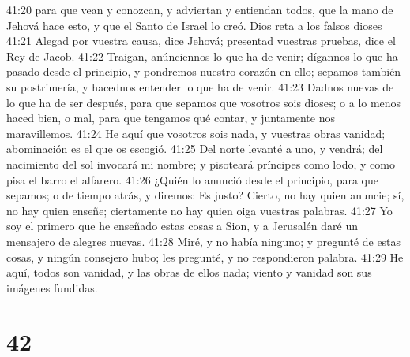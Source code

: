 41:20 para que vean y conozcan, y adviertan y entiendan todos, que la mano de Jehová hace esto, y que el Santo de Israel lo creó.  
Dios reta a los falsos dioses  
41:21 Alegad por vuestra causa, dice Jehová; presentad vuestras pruebas, dice el Rey de Jacob.  
41:22 Traigan, anúnciennos lo que ha de venir; dígannos lo que ha pasado desde el principio, y pondremos nuestro corazón en ello; sepamos también su postrimería, y hacednos entender lo que ha de venir.  
41:23 Dadnos nuevas de lo que ha de ser después, para que sepamos que vosotros sois dioses; o a lo menos haced bien, o mal, para que tengamos qué contar, y juntamente nos maravillemos.  
41:24 He aquí que vosotros sois nada, y vuestras obras vanidad; abominación es el que os escogió.  
41:25 Del norte levanté a uno, y vendrá; del nacimiento del sol invocará mi nombre; y pisoteará príncipes como lodo, y como pisa el barro el alfarero.  
41:26 ¿Quién lo anunció desde el principio, para que sepamos; o de tiempo atrás, y diremos: Es justo? Cierto, no hay quien anuncie; sí, no hay quien enseñe; ciertamente no hay quien oiga vuestras palabras.  
41:27 Yo soy el primero que he enseñado estas cosas a Sion, y a Jerusalén daré un mensajero de alegres nuevas.  
41:28 Miré, y no había ninguno; y pregunté de estas cosas, y ningún consejero hubo; les pregunté, y no respondieron palabra.  
41:29 He aquí, todos son vanidad, y las obras de ellos nada; viento y vanidad son sus imágenes fundidas.  

\chapter{42}

